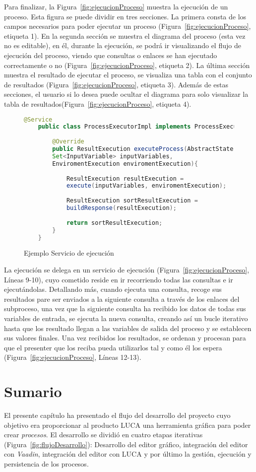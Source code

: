 Para finalizar, la Figura~\ref{fig:ejecucionProceso} muestra la ejecución de un proceso. Esta figura se puede dividir en tres secciones. La primera consta de los campos necesarios para poder ejecutar un proceso (Figura~\ref{fig:ejecucionProceso}, etiqueta 1). En la segunda sección se muestra el diagrama del proceso (esta vez no es editable), en él, durante la ejecución, se podrá ir visualizando el flujo de ejecución del proceso, viendo que consultas o enlaces se han ejecutado correctamente o no (Figura~\ref{fig:ejecucionProceso}, etiqueta 2). La última sección muestra el resultado de ejecutar el proceso, se visualiza una tabla con el conjunto de resultados (Figura~\ref{fig:ejecucionProceso}, etiqueta 3). Además de estas secciones, el usuario si lo desea puede ocultar el diagrama para solo visualizar la tabla de resultados(Figura~\ref{fig:ejecucionProceso}, etiqueta 4).

\begin{figure}[H]
	\centering
	\begin{lstlisting}[language=Java]
	@Service
	public class ProcessExecutorImpl implements ProcessExecutor{
	
		@Override
		public ResultExecution executeProcess(AbstractState state, 
		Set<InputVariable> inputVariables, 
		EnviromentExecution enviromentExecution){
		
			ResultExecution resultExecution = 
			execute(inputVariables, enviromentExecution);
			
			ResultExecution sortResultExecution = 
			buildResponse(resultExecution);
			
			return sortResultExecution;
		}
	}\end{lstlisting}
	\caption{Ejemplo Servicio de ejecución}
	\label{fig:executionExample}
\end{figure}

La ejecución se delega en un servicio de ejecución (Figura~\ref{fig:ejecucionProceso}, Líneas 9-10), cuyo cometido reside en ir recorriendo todas las consultas e ir ejecutándolas. Detallando más, cuando ejecuta una consulta, recoge sus resultados pare ser enviados a la siguiente consulta a través de los enlaces del subproceso, una vez que la siguiente consulta ha recibido los datos de todas sus variables de entrada, se ejecuta la nueva consulta, creando así un bucle iterativo hasta que los resultado llegan a las variables de salida del proceso y se establecen sus valores finales. Una vez recibidos los resultados, se ordenan y procesan para que el presenter que los reciba pueda utilizarlos tal y como él los espera (Figura~\ref{fig:ejecucionProceso}, Líneas 12-13).

\section{Sumario}
El presente capítulo ha presentado el flujo del desarrollo del proyecto cuyo objetivo era proporcionar al producto LUCA una herramienta gráfica para poder crear \emph{procesos}. El desarrollo se dividió en cuatro etapas iterativas  (Figura~\ref{fig:flujoDesarrollo}): Desarrollo del editor gráfico, integración del editor con \emph{Vaadin}, integración del editor con LUCA y por último la gestión, ejecución y persistencia de los procesos.


